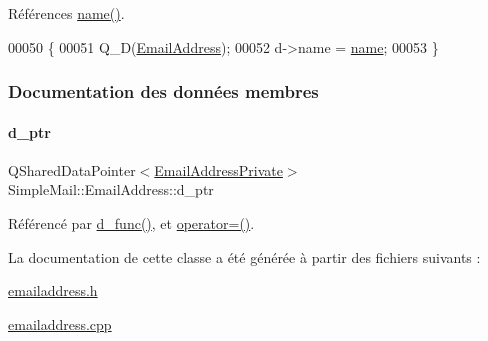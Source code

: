 Références \hyperlink{class_simple_mail_1_1_email_address_a311fdcf9bc548a3db4a985b396ab5355}{name()}.


\begin{DoxyCode}
00050 \{
00051     Q\_D(\hyperlink{class_simple_mail_1_1_email_address}{EmailAddress});
00052     d->name = \hyperlink{class_simple_mail_1_1_email_address_a311fdcf9bc548a3db4a985b396ab5355}{name};
00053 \}
\end{DoxyCode}


\subsubsection{Documentation des données membres}
\mbox{\label{class_simple_mail_1_1_email_address_a27188c75c77a942e79cac0420788f214}} 
\paragraph{\texorpdfstring{d\+\_\+ptr}{d\_ptr}}
{\footnotesize\ttfamily Q\+Shared\+Data\+Pointer$<$\hyperlink{class_simple_mail_1_1_email_address_private}{Email\+Address\+Private}$>$ Simple\+Mail\+::\+Email\+Address\+::d\+\_\+ptr\hspace{0.3cm}{\ttfamily [protected]}}



Référencé par \hyperlink{class_simple_mail_1_1_email_address_aa1ad0e3e3ff067e2c41ed350edc23a03}{d\+\_\+func()}, et \hyperlink{class_simple_mail_1_1_email_address_a833afb6d4b354bddffa26fd71c70fc2e}{operator=()}.



La documentation de cette classe a été générée à partir des fichiers suivants \+:\begin{DoxyCompactItemize}
\item 
\hyperlink{emailaddress_8h}{emailaddress.\+h}\item 
\hyperlink{emailaddress_8cpp}{emailaddress.\+cpp}\end{DoxyCompactItemize}
